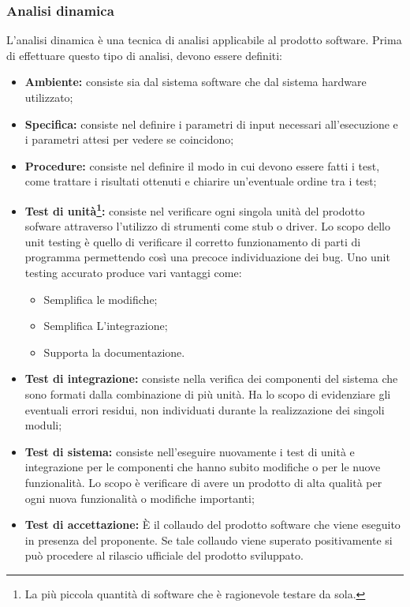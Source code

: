 	\subsubsection{Analisi dinamica}
	L'analisi dinamica è una tecnica di analisi applicabile al prodotto software. 
	Prima di effettuare questo tipo di analisi, devono essere definiti:
	\begin{itemize}
		\item \textbf{Ambiente:} consiste sia dal sistema software che dal sistema hardware utilizzato;
		\item \textbf{Specifica:} consiste nel definire i parametri di input necessari all'esecuzione e i parametri attesi per vedere se coincidono;
		\item \textbf{Procedure:} consiste nel definire il modo in cui devono essere fatti i test, come trattare i risultati ottenuti e chiarire un'eventuale ordine tra i test;
		\item \textbf{Test di unità\footnote{La più piccola quantità di software che è ragionevole testare da sola.}:} consiste nel verificare ogni singola unità del prodotto sofware attraverso l'utilizzo di strumenti come stub o driver. Lo scopo dello unit testing è quello di verificare il corretto funzionamento di parti di programma permettendo così una precoce individuazione dei bug. Uno unit testing accurato produce vari vantaggi come:
			\begin{itemize}
				\item Semplifica le modifiche;
				\item Semplifica L'integrazione;
				\item Supporta la documentazione.
			\end{itemize}
		\item \textbf{Test di integrazione:} consiste nella verifica dei componenti del sistema che sono formati dalla combinazione di più unità. Ha lo scopo di evidenziare gli eventuali errori residui, non individuati durante la realizzazione dei singoli moduli;
		\item \textbf{Test di sistema:} consiste nell'eseguire nuovamente i test di unità e integrazione per le componenti che hanno subito modifiche o per le nuove funzionalità. Lo scopo è verificare di avere un prodotto di alta qualità per ogni nuova funzionalità o modifiche importanti;
		\item \textbf{Test di accettazione:} È il collaudo del prodotto software che viene eseguito in presenza del proponente. Se tale collaudo viene superato positivamente si può procedere al rilascio ufficiale del prodotto sviluppato.
	\end{itemize}
\newpage
